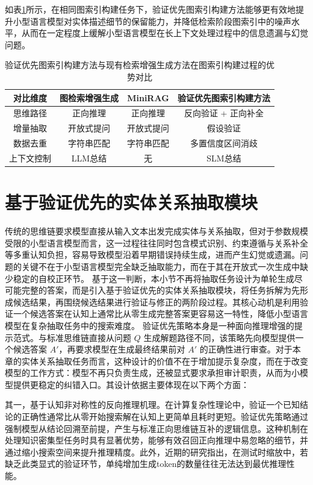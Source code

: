 \documentclass[promaster, vlined]{DissertUESTC}
\begin{document}
如表\ref{table_index_graph_comparison}所示，在相同图索引构建任务下，验证优先图索引构建方法能够更有效地提升小型语言模型对实体描述细节的保留能力，并降低检索阶段图索引中的噪声水平，从而在一定程度上缓解小型语言模型在长上下文处理过程中的信息遗漏与幻觉问题。

\begin{table}[!ht]
\centering
\caption{验证优先图索引构建方法与现有检索增强生成方法在图索引构建过程的优势对比}
\begin{tabular*}{\textwidth}{@{\extracolsep{\fill}}cccc}
\toprule
\multicolumn{1}{c}{对比维度}& 图检索增强生成  & MiniRAG  & 验证优先图索引构建方法   \\
\midrule
思维路径 & 正向推理 & 正向推理 & 反向验证 + 正向补全 \\
增量抽取 & 开放式提问 & 开放式提问 & 假设验证 \\
数据去重 & 字符串匹配 & 字符串匹配 & 多置信度区间消歧 \\
上下文控制 & LLM总结 & 无 & SLM总结 \\
\bottomrule
\end{tabular*}
\label{table_index_graph_comparison}
\end{table}


\section{基于验证优先的实体关系抽取模块}
传统的思维链要求模型直接从输入文本出发完成实体与关系抽取，但对于参数规模受限的小型语言模型而言，这一过程往往同时包含模式识别、约束遵循与关系补全等多重认知负担，容易导致模型沿着早期错误持续生成，进而产生幻觉或遗漏。问题的关键不在于小型语言模型完全缺乏抽取能力，而在于其在开放式一次生成中缺少稳定的自校正环节。
基于这一判断，本小节不再将抽取任务设计为单轮生成尽可能完整的答案，而是引入基于验证优先的实体关系抽取模块，将任务拆解为先形成候选结果，再围绕候选结果进行验证与修正的两阶段过程。其核心动机是利用验证一个候选答案在认知上通常比从零生成完整答案更容易这一特性，降低小型语言模型在复杂抽取任务中的搜索难度。
验证优先策略本身是一种面向推理增强的提示范式。与标准思维链直接从问题 $Q$ 生成解题路径不同，该策略先向模型提供一个候选答案 $A'$，再要求模型在生成最终结果前对 $A'$ 的正确性进行审查。对于本章的实体关系抽取任务而言，这种设计的价值不在于增加提示复杂度，而在于改变模型的工作方式：模型不再只负责生成，还被显式要求承担审计职责，从而为小模型提供更稳定的纠错入口。其设计依据主要体现在以下两个方面：

其一，基于认知非对称性的反向推理机理。在计算复杂性理论中，验证一个已知结论的正确性通常比从零开始搜索解在认知上更简单且耗时更短。验证优先策略通过强制模型从结论回溯至前提，产生与标准正向思维链互补的逻辑信息。这种机制在处理知识密集型任务时具有显著优势，能够有效召回正向推理中易忽略的细节，并通过缩小搜索空间来提升推理精度。此外，近期的研究\cite{setlur2025scaling}指出，在测试时缩放中，若缺乏此类显式的验证环节，单纯增加生成token的数量往往无法达到最优推理性能。
\end{document}
